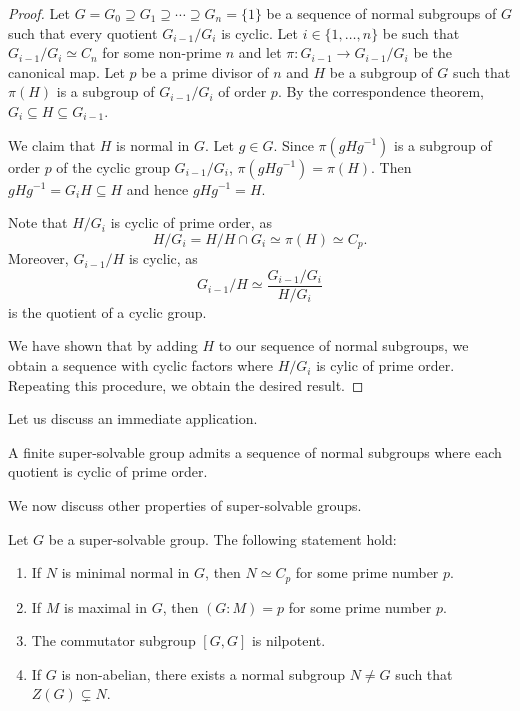 \begin{proof}
Let $G=G_0\supseteq G_1\supseteq\cdots\supseteq G_n=\{1\}$ be a sequence of normal subgroups
of $G$ such that every quotient $G_{i-1}/G_i$ is cyclic. Let 
$i\in\{1,\dots,n\}$ be such that $G_{i-1}/G_i\simeq C_n$ for some non-prime  
$n$ and let $\pi\colon G_{i-1}\to G_{i-1}/G_i$ be the canonical map. 
Let $p$ be a prime divisor of $n$ and $H$ be a subgroup of $G$ such that 
$\pi(H)$ is a subgroup of $G_{i-1}/G_i$ of order $p$. By the correspondence theorem, 
$G_{i}\subseteq H\subseteq G_{i-1}$. 

We claim that $H$ is normal in $G$. Let $g\in G$. Since $\pi(gHg^{-1})$ is a subgroup of order $p$ of 
the cyclic group $G_{i-1}/G_i$, $\pi(gHg^{-1})=\pi(H)$. Then 
$gHg^{-1}=G_{i}H\subseteq H$ and hence $gHg^{-1}=H$. 

Note that $H/G_i$ is cyclic of prime order, as 
\[
H/G_i=H/H\cap G_i\simeq \pi(H)\simeq C_p. 
\]
Moreover, $G_{i-1}/H$ is cyclic, as 
\[
G_{i-1}/H\simeq\frac{G_{i-1}/G_i}{H/G_i}
\]
is the quotient of a cyclic group. 
	
We have shown that by adding $H$ to our sequence of normal subgroups, 
we obtain a sequence with cyclic factors where 
$H/G_{i}$ is cylic of prime order. Repeating this procedure, we obtain the desired result. 
\end{proof}

Let us discuss an immediate application. 

\begin{corollary}
A finite super-solvable group admits a sequence 
of normal subgroups where each quotient is cyclic of prime order. 
\end{corollary}


We now discuss other properties of super-solvable groups. 

\begin{theorem}
\label{thm:super_structure}
Let $G$ be a super-solvable group. The following statement hold:  
\begin{enumerate}
\item If $N$ is minimal normal in $G$, then $N\simeq C_p$ for some prime number $p$.
\item If $M$ is maximal in $G$, then $(G:M)=p$ for some prime number $p$.
\item The commutator subgroup $[G,G]$ is nilpotent. 
\item If $G$ is non-abelian, there exists a normal subgroup $N\ne G$ such that
	$Z(G)\subsetneq N$.
\end{enumerate}
\end{theorem}

